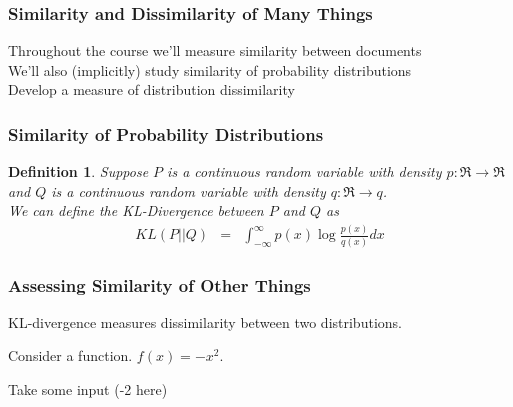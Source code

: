 \documentclass{beamer}
\newtheorem{defn}{Definition}
\numberwithin{equation}{section}
\begin{document}
\begin{frame}
\frametitle{Similarity and Dissimilarity of Many Things}

Throughout the course we'll measure \alert{similarity} between documents\\
We'll also (implicitly) study \alert{similarity of probability distributions}\\
Develop a measure of distribution dissimilarity\\

\end{frame}

\begin{frame}
\frametitle{Similarity of Probability Distributions}

\begin{defn}
Suppose $P$ is a continuous random variable with density $p:\Re \rightarrow \Re$ and $Q$ is a continuous random variable with 
density $q:\Re \rightarrow q$.  \\

We can define the KL-Divergence between $P$ and $Q$ as
\begin{eqnarray}
KL(P||Q) & = & \int_{-\infty}^{\infty} p(x) \log \frac{p(x)}{q(x)} dx \nonumber 
\end{eqnarray}
\end{defn}



\end{frame}


\begin{frame}
\frametitle{Assessing Similarity of Other Things}

 KL-divergence measures \alert{dissimilarity}
between two distributions.
\end{frame}



\begin{frame}
Consider a function. $f(x) = - x^2$. \pause \\
 \pause
\begin{center}
\end{center}
\end{frame}

\begin{frame}
Take some input (-2 here)
\begin{center}
\end{center}
\end{frame}
\end{document}
